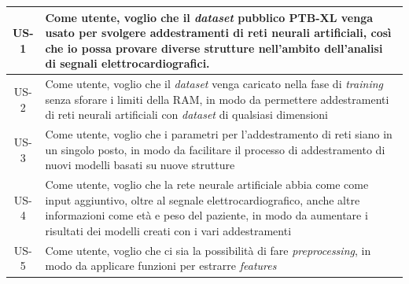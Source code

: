 \begin{center}
\begin{longtable}{|p{2.5cm}|p{10.5cm}|}
    \multicolumn{1}{|c|}{US-1} & Come utente, voglio che il \textit{dataset} pubblico PTB-XL venga usato per svolgere addestramenti di reti neurali artificiali, così che io possa provare diverse strutture nell'ambito dell'analisi di segnali elettrocardiografici. \\
    \hline
    \multicolumn{1}{|c|}{US-2} & Come utente, voglio che il \textit{dataset} venga caricato nella fase di \textit{training} senza sforare i limiti della RAM, in modo da permettere addestramenti di reti neurali artificiali con \textit{dataset} di qualsiasi dimensioni \\
    \hline
    \multicolumn{1}{|c|}{US-3} & Come utente, voglio che i parametri per l'addestramento di reti siano in un singolo posto, in modo da facilitare il processo di addestramento di nuovi modelli basati su nuove strutture \\
    \hline
    \multicolumn{1}{|c|}{US-4} & Come utente, voglio che la rete neurale artificiale abbia come come input aggiuntivo, oltre al segnale elettrocardiografico, anche altre informazioni come età e peso del paziente, in modo da aumentare i risultati dei modelli creati con i vari addestramenti \\
    \hline
    \multicolumn{1}{|c|}{US-5} & Come utente, voglio che ci sia la possibilità di fare \textit{preprocessing}, in modo da applicare funzioni per estrarre \textit{features} \\
    \hline

\end{longtable}
\end{center}
